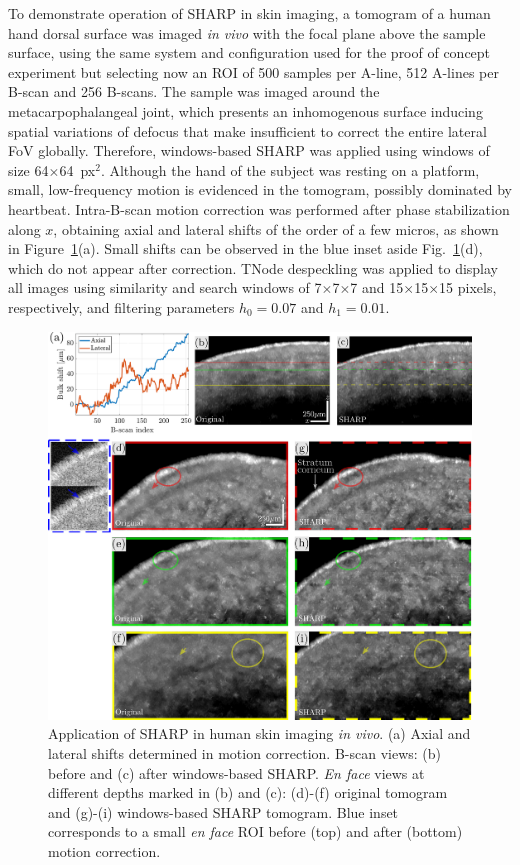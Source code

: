 To demonstrate operation of SHARP in skin imaging, a tomogram of a human hand dorsal surface was imaged \textit{in vivo} with the focal plane above the sample surface, using the same system and configuration used for the proof of concept experiment but selecting now an ROI of 500 samples per A-line, 512 A-lines per B-scan and 256 B-scans. The sample was imaged around the metacarpophalangeal joint, which presents an inhomogenous surface inducing spatial variations of defocus that make insufficient to correct the entire lateral FoV globally. Therefore, windows-based SHARP was applied using windows of size 64$\times$64~px$^2$. Although the hand of the subject was resting on a platform, small, low-frequency motion is evidenced in the tomogram, possibly dominated by heartbeat. Intra-B-scan motion correction was performed after phase stabilization along $x$, obtaining axial and lateral shifts of the order of a few micros, as shown in Figure~\ref{fig:SkinImaging}(a). Small shifts can be observed in the  blue inset aside Fig.~\ref{fig:SkinImaging}(d), which do not appear after correction. TNode despeckling was applied to display all images using similarity and search windows of 7$\times$7$\times$7 and 15$\times$15$\times$15 pixels, respectively, and filtering parameters $h_0 = 0.07$ and $h_1 = 0.01$.

\begin{figure}[htb!]
	\centering
	\includegraphics[width=\textwidth]{Figures/Results/SkinImaging.pdf}
	\caption[Application of SHARP in skin imaging \textit{in vivo}]{Application of SHARP in human skin imaging \textit{in vivo}. (a) Axial and lateral shifts determined in motion correction. B-scan views: (b) before and (c) after windows-based SHARP. \textit{En face} views at different depths marked in (b) and (c): (d)-(f) original tomogram and (g)-(i) windows-based SHARP tomogram. Blue inset corresponds to a small \textit{en face} ROI before (top) and after (bottom) motion correction.}
	\label{fig:SkinImaging}
\end{figure}

